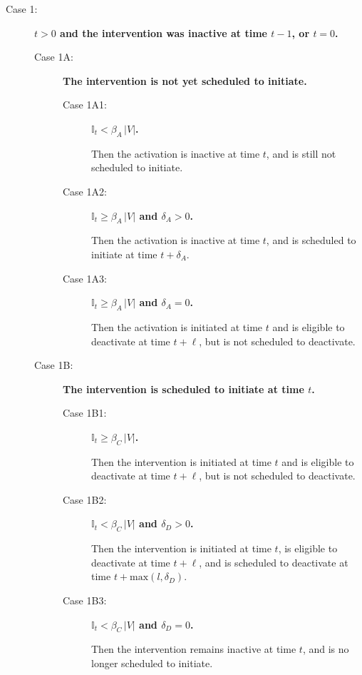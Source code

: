 \documentclass[11pt]{article}
\newcommand{\istate}{\mbox{$\mathbb{I}$}}
\begin{document}
\begin{description}
\item
[Case 1:]
{\bf $t > 0$ and the intervention was inactive at time $t\!-\!1$, or $t= 0$.}
\begin{description}
\item
[Case 1A:]
{\bf The intervention is not yet scheduled to initiate.}

\begin{description}
\item
[Case 1A1:] 
{\bf $\istate_t<\beta_A \, |V|$.}

Then the activation is inactive at time $t$, and is still not scheduled to initiate.

\item
[Case 1A2:] 
{\bf $\istate_t \geq \beta_A \, |V|$ and $\delta_A > 0$.}

Then the activation is inactive at time $t$, and is scheduled to initiate at time $t + \delta_A$.

\item
[Case 1A3:] 
{\bf $\istate_t \geq \beta_A \, |V|$ and $\delta_A = 0$.}

Then the activation is initiated at time $t$
and is eligible to deactivate at time $t+\ell$,
but is not scheduled to deactivate.

\end{description}

\item
[Case 1B:]
{\bf The intervention is scheduled to initiate at time $t$.}

\begin{description}
\item
[Case 1B1:] 
{\bf $\istate_t \geq \beta_C \, |V|$.}

Then the intervention is initiated at time $t$ and is eligible to deactivate at time $t+\ell$,
but is not scheduled to deactivate.

\item
[Case 1B2:] 
{\bf $\istate_t < \beta_C \, |V|$ and $\delta_D > 0$.}

Then the intervention is initiated at time $t$, is eligible to deactivate at time $t+\ell$,
and is scheduled to deactivate at time $t + \mbox{max}(l, \delta_D)$.

\item
[Case 1B3:] 
{\bf $\istate_t < \beta_C \, |V|$ and $\delta_D = 0$.}

Then the intervention remains inactive at time $t$, and is no longer scheduled to initiate.
\end{description}


\end{description}
\end{description}
\end{document}
